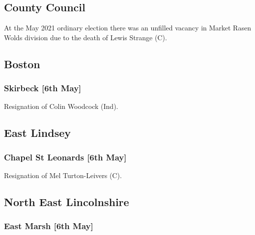 \documentclass[a4paper,openany]{book}
\begin{document}
\begin{resultsiii}
\subsection*{County Council}

At the May 2021 ordinary election there was an unfilled vacancy in Market Rasen Wolds division due to the death of Lewis Strange (C).%

\subsection*{Boston}

\subsubsection*{Skirbeck \hspace*{\fill}\nolinebreak[1]%
	\enspace\hspace*{\fill}
	[6th May]}


Resignation of Colin Woodcock (Ind).

\subsection*{East Lindsey}

\subsubsection*{Chapel St Leonards \hspace*{\fill}\nolinebreak[1]%
	\enspace\hspace*{\fill}
	[6th May]}


Resignation of Mel Turton-Leivers (C).

\subsection*{North East Lincolnshire}

\subsubsection*{East Marsh \hspace*{\fill}\nolinebreak[1]%
	\enspace\hspace*{\fill}
	[6th May]}


\end{resultsiii}
\end{document}
